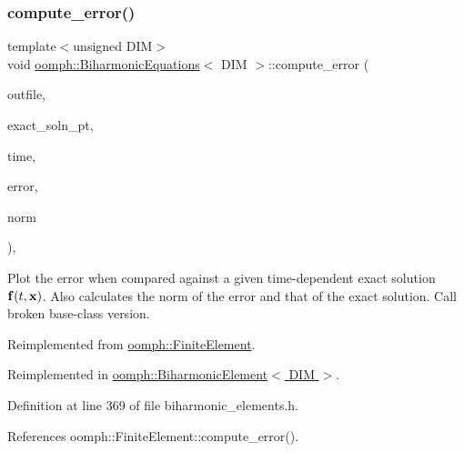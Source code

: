 \mbox{\label{classoomph_1_1BiharmonicEquations_a33e635f29e497c978a68bf5094391038}} 
\subsubsection{\texorpdfstring{compute\+\_\+error()}{compute\_error()}\hspace{0.1cm}{\footnotesize\ttfamily [2/2]}}
{\footnotesize\ttfamily template$<$unsigned D\+IM$>$ \\
void \hyperlink{classoomph_1_1BiharmonicEquations}{oomph\+::\+Biharmonic\+Equations}$<$ D\+IM $>$\+::compute\+\_\+error (\begin{DoxyParamCaption}\item[{std\+::ostream \&}]{outfile,  }\item[{\hyperlink{classoomph_1_1FiniteElement_ad4ecf2b61b158a4b4d351a60d23c633e}{Finite\+Element\+::\+Unsteady\+Exact\+Solution\+Fct\+Pt}}]{exact\+\_\+soln\+\_\+pt,  }\item[{const double \&}]{time,  }\item[{double \&}]{error,  }\item[{double \&}]{norm }\end{DoxyParamCaption})\hspace{0.3cm}{\ttfamily [inline]}, {\ttfamily [virtual]}}



Plot the error when compared against a given time-\/dependent exact solution $ {\bf f}(t,{\bf x}) $. Also calculates the norm of the error and that of the exact solution. Call broken base-\/class version. 



Reimplemented from \hyperlink{classoomph_1_1FiniteElement_a7f67853506dc73fa6b7505108de22d1f}{oomph\+::\+Finite\+Element}.



Reimplemented in \hyperlink{classoomph_1_1BiharmonicElement_a0b1d07f8300afffeacaabb3aef2841fb}{oomph\+::\+Biharmonic\+Element$<$ D\+I\+M $>$}.



Definition at line 369 of file biharmonic\+\_\+elements.\+h.



References oomph\+::\+Finite\+Element\+::compute\+\_\+error().

